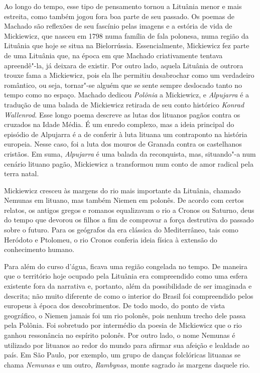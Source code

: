 Ao longo do
tempo, esse tipo de pensamento tornou a Lituânia menor e mais estreita,
como também jogou fora boa parte de seu passado. Os poemas de Machado
são reflexões de seu fascínio pelas imagens e a estória de vida de
Mickiewicz, que nasceu em 1798 numa família de fala polonesa, numa
região da Lituânia que hoje se situa na Bielorrússia. Essencialmente,
Mickiewicz fez parte de uma Lituânia que, na época em que Machado
criativamente tentava apreendê"-la, já deixara de existir. Por outro
lado, aquela Lituânia de outrora trouxe fama a Mickiewicz, pois ela lhe
permitiu desabrochar como um verdadeiro romântico, ou seja, tornar"-se
alguém que se sente sempre deslocado tanto no tempo como no espaço.
Machado dedicou \textit{Polônia} a Mickiewicz, e \textit{Alpujarra} é a
tradução de uma balada de Mickiewicz retirada de seu conto histórico
\textit{Konrad Wallenrod}. Esse longo poema descreve as lutas dos lituanos
pagãos contra os cruzados na Idade Média. É um enredo complexo, mas a
ideia principal do episódio de Alpujarra é a de conferir à luta lituana
um contraponto na história europeia. Nesse caso, foi a luta dos mouros
de Granada contra os castelhanos cristãos. Em suma, \textit{Alpujarra} é
uma balada da reconquista, mas, situando"-a num cenário lituano pagão,
Mickiewicz a transformou num conto de amor radical pela terra natal.

Mickiewicz cresceu às margens do rio mais importante da Lituânia,
chamado Nemunas em lituano, mas também Niemen em polonês. De acordo com
certos relatos, os antigos gregos e romanos equalizavam o rio a Cronos
ou Saturno, deus do tempo que devorou os filhos a fim de comprovar a
força destrutiva do passado sobre o futuro. Para os geógrafos da era
clássica do Mediterrâneo, tais como Heródoto e Ptolomeu, o rio Cronos
conferia ideia física à extensão do conhecimento humano.

Para além do curso d'água, ficava uma região congelada no tempo. De
maneira que o território hoje ocupado pela Lituânia era compreendido
como uma esfera existente fora da narrativa e, portanto, além da
possibilidade de ser imaginada e descrita; não muito diferente de como o
interior do Brasil foi compreendido pelos europeus à época dos
descobrimentos. De todo modo, do ponto de vista geográfico, o Niemen
jamais foi um rio polonês, pois nenhum trecho dele passa pela Polônia.
Foi sobretudo por intermédio da poesia de Mickiewicz que o rio ganhou
ressonância no espírito polonês. Por outro lado, o nome Nemunas é
utilizado por lituanos ao redor do mundo para afirmar sua afeição e
lealdade ao país. Em São Paulo, por exemplo, um grupo de danças
folclóricas lituanas se chama \textit{Nemunas} e um outro,
\textit{Rambynas}, monte sagrado às margens daquele rio.

